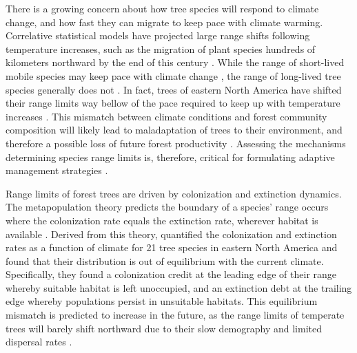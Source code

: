 There is a growing concern about how tree species will respond to
climate change, and how fast they can migrate to keep pace with climate
warming. Correlative statistical models have projected large range
shifts following temperature increases, such as the migration of plant
species hundreds of kilometers northward by the end of this century
\citep{Malcolm2002, Mckenney2007}. While the range of short-lived mobile
species may keep pace with climate change \citep{Chen2011}, the range of
long-lived tree species generally does not \citep{Harsch2009, Zhu2012}.
In fact, trees of eastern North America have shifted their range limits
way bellow of the pace required to keep up with temperature increases
\citep{BoisvertMarsh2014, BoisvertMarsh2019, Sittaro2017}. This mismatch
between climate conditions and forest community composition will likely
lead to maladaptation of trees to their environment, and therefore a
possible loss of future forest productivity \citep{Aitken2008}.
Assessing the mechanisms determining species range limits is, therefore,
critical for formulating adaptive management strategies
\citep{Becknell2015a}.

Range limits of forest trees are driven by colonization and extinction
dynamics. The metapopulation theory predicts the boundary of a species'
range occurs where the colonization rate equals the extinction rate,
wherever habitat is available \citep{Holt2000}. Derived from this
theory, \citet{Talluto2017} quantified the colonization and extinction
rates as a function of climate for 21 tree species in eastern North
America and found that their distribution is out of equilibrium with the
current climate. Specifically, they found a colonization credit at the
leading edge of their range whereby suitable habitat is left unoccupied,
and an extinction debt at the trailing edge whereby populations persist
in unsuitable habitats. This equilibrium mismatch is predicted to
increase in the future, as the range limits of temperate trees will
barely shift northward due to their slow demography and limited
dispersal rates \citep{Vissault2020}.

